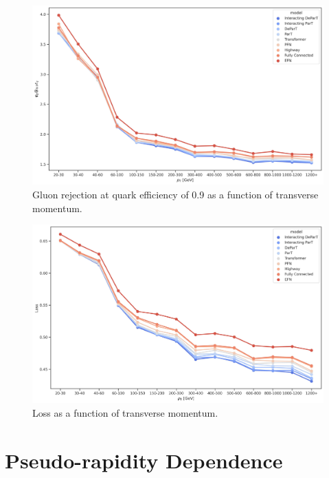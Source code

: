 \begin{figure}[htb]
    \centering
    \includegraphics[width=1\linewidth]{src/plots/results/pT_dep/gluon_rej_at_quark_eff_0.9.jpg}
    \caption{Gluon rejection at quark efficiency of 0.9 as a function of transverse momentum.}
    \label{fig:gluon_rej_at_quark_eff_0.9_pt}
\end{figure}

\begin{figure}[htb]
    \centering
    \includegraphics[width=1\linewidth]{src/plots/results/pT_dep/loss.jpg}
    \caption{Loss as a function of transverse momentum.}
    \label{fig:loss_pt}
\end{figure}

\FloatBarrier

\section{Pseudo-rapidity Dependence}
\label{sec:app_eta_dep}

